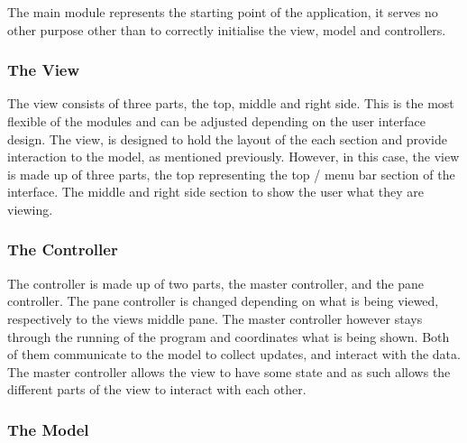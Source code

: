 The main module represents the starting point of the application, it serves no other purpose other than to correctly initialise the view, model and controllers.

\subsubsection{The View}
\label{subsubsec:the_view}

The view consists of three parts, the top, middle and right side. This is the most flexible of the modules and can be adjusted depending on the user interface design. The view, is designed to hold the layout of the each section and provide interaction to the model, as mentioned previously. However, in this case, the view is made up of three parts, the top representing the top / menu bar section of the interface. The middle and right side section to show the user what they are viewing.

\subsubsection{The Controller}
\label{subsubsec:the_controller}

The controller is made up of two parts, the master controller, and the pane controller. The pane controller is changed depending on what is being viewed, respectively to the views middle pane. The master controller however stays through the running of the program and coordinates what is being shown. Both of them communicate to the model to collect updates, and interact with the data. The master controller allows the view to have some state and as such allows the different parts of the view to interact with each other.

\subsubsection{The Model}
\label{subsubsec:the_model}

